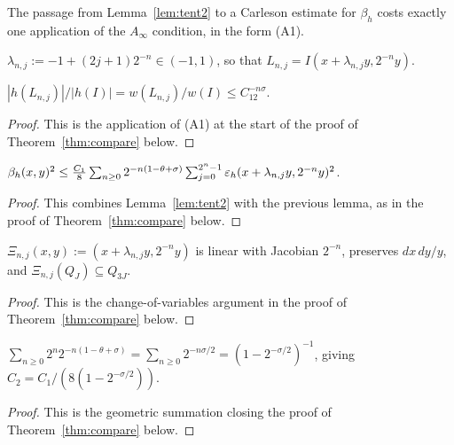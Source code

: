 The passage from Lemma~\ref{lem:tent2} to a Carleson estimate for $\beta_h$
costs exactly one application of the $A_\infty$ condition, in the form (A1).

\begin{definition}\label{def:dyadicShift}
	\leanok
	$\lambda_{n,j}:=-1+(2j+1)2^{-n}\in(-1,1)$, so that $L_{n,j}=I(x+\lambda_{n,j}y,2^{-n}y)$.
\end{definition}

\begin{lemma}\label{lem:a1_dyadic_ratio}
	\leanok
	$|h(L_{n,j})|/|h(I)|=w(L_{n,j})/w(I)\le C_12^{-n\sigma}$.
\end{lemma}
\begin{proof}
	This is the application of (A1) at the start of the proof of Theorem~\ref{thm:compare} below.
\end{proof}

\begin{lemma}\label{lem:beta_sq_pointwise_bound}
	\leanok
	$\beta_h(x,y)^2\le\tfrac{C_1}8\sum_{n\ge0}2^{-n(1-\theta+\sigma)}\sum_{j=0}^{2^n-1}\varepsilon_h(x+\lambda_{n,j}y,2^{-n}y)^2$.
\end{lemma}
\begin{proof}
	This combines Lemma~\ref{lem:tent2} with the previous lemma, as in the proof of Theorem~\ref{thm:compare} below.
\end{proof}

\begin{lemma}\label{lem:carlesonBoxIntegral_dyadicShift}
	\leanok
	$\Xi_{n,j}(x,y):=(x+\lambda_{n,j}y,2^{-n}y)$ is linear with Jacobian $2^{-n}$, preserves $dx\,dy/y$, and $\Xi_{n,j}(Q_J)\subseteq Q_{3J}$.
\end{lemma}
\begin{proof}
	This is the change-of-variables argument in the proof of Theorem~\ref{thm:compare} below.
\end{proof}

\begin{lemma}\label{lem:comparisonConst_geometric}
	\leanok
	$\sum_{n\ge0}2^n2^{-n(1-\theta+\sigma)}=\sum_{n\ge0}2^{-n\sigma/2}=(1-2^{-\sigma/2})^{-1}$, giving $C_2=C_1/(8(1-2^{-\sigma/2}))$.
\end{lemma}
\begin{proof}
	This is the geometric summation closing the proof of Theorem~\ref{thm:compare} below.
\end{proof}

